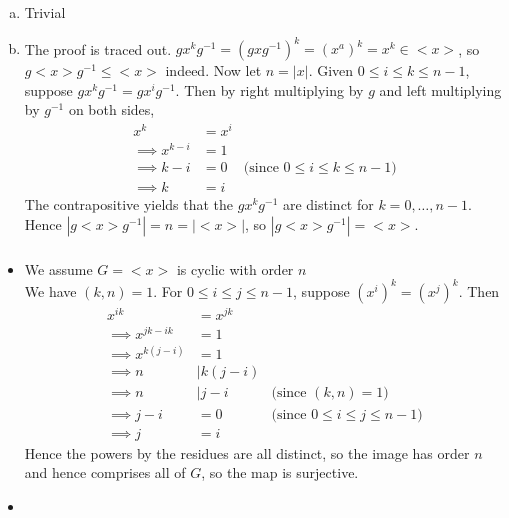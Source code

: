 \documentclass{article}
\newcommand{\inv}[1]{ {#1}^{-1} }
\newcommand{\norm}[1]{|#1|}
\newcommand{\divides}{\vert}
\newcommand{\cyclic}[1]{<#1>}
\begin{document}
\subsubsection{}\label{ex3p21}
\subsubsection{}\label{ex3p22}
\subsubsection{}\label{ex3p23}
\subsubsection{}\label{ex3p24}
\begin{enumerate}[(a)]
\item Trivial
\item The proof is traced out. $gx^k\inv{g}=(gx\inv{g})^k = (x^a)^k = x^k \in \cyclic{x}$, so $g\cyclic{x}\inv{g} \leq \cyclic{x}$ indeed. Now let $n=\norm{x}$. Given $0 \leq i \leq k \leq n-1$, suppose $gx^k\inv{g} = gx^i\inv{g}$. Then by right multiplying by $g$ and left multiplying by $\inv{g}$ on both sides,
\begin{align*}
x^k &= x^i\\
\implies x^{k-i} &= 1\\
\implies k-i &= 0 & \mbox{(since $0\leq i\leq k\leq n-1$)}\\
\implies k &= i
\end{align*}
The contrapositive yields that the $gx^k\inv{g}$ are distinct for $k=0,\ldots,n-1$. Hence $\norm{g\cyclic{x}\inv{g}} = n = \norm{\cyclic{x}}$, so $\norm{g\cyclic{x}\inv{g}} = \cyclic{x}$.
\end{enumerate}
\subsubsection{}\label{ex3p25}
\begin{itemize} \label{ex3p25a}
\item We assume $G = \cyclic{x}$ is cyclic with order $n$\\
We have $(k,n)=1$. For $0\leq i \leq j \leq n-1$, suppose $(x^i)^k = (x^j)^k$. Then
\begin{align*}
x^{ik} &= x^{jk}\\
\implies x^{jk - ik} &= 1\\
\implies x^{k(j - i)} &= 1\\
\implies n &\divides k(j-i)\\
\implies n &\divides j-i & \mbox{(since $(k,n)=1$)}\\
\implies j-i &= 0 & \mbox{(since $0\leq i \leq j \leq n-1$)}\\
\implies j &= i
\end{align*}
Hence the powers by the residues are all distinct, so the image has order $n$ and hence comprises all of $G$, so the map is surjective.
\item
\end{itemize}
\end{document}
